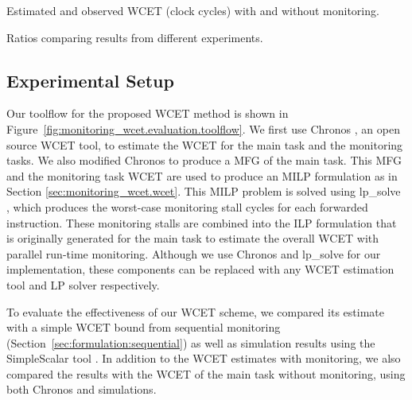 \begin{table}
  \begin{center}
    \begin{scriptsize}
    
    \end{scriptsize}
    \caption{Estimated and observed WCET (clock cycles) with and without monitoring.}
    \label{tab:monitoring_wcet.evaluation.wcet}
  \end{center}
\end{table}

\begin{table}
  \begin{center}
    \begin{tiny}
    
    \end{tiny}
    \caption{Ratios comparing results from different experiments.} 
    \label{tab:monitoring_wcet.evaluation.ratios}
  \end{center}
\end{table}

\subsection{Experimental Setup}

Our toolflow for the proposed WCET method is shown in
Figure~\ref{fig:monitoring_wcet.evaluation.toolflow}. We first use Chronos
\cite{chronos-tool}, an open source WCET tool, to estimate the WCET for the
main task and the monitoring tasks. We also modified Chronos to produce a MFG
of the main task. This MFG and the monitoring task WCET are used to produce an
MILP formulation as in Section \ref{sec:monitoring_wcet.wcet}. This MILP
problem is solved using lp\_solve \cite{lpsolve}, which produces the worst-case
monitoring stall cycles for each forwarded instruction. These monitoring stalls
are combined into the ILP formulation that is originally generated for the main
task to estimate the overall WCET with parallel run-time monitoring. Although
we use Chronos and lp\_solve for our implementation, these components can be
replaced with any WCET estimation tool and LP solver respectively.

To evaluate the effectiveness of our WCET scheme, we compared its estimate
with a simple WCET bound from sequential monitoring (Section~\ref{sec:formulation:sequential})
as well as simulation results using the SimpleScalar tool \cite{simplescalar}.
In addition to the WCET estimates with monitoring, we also compared the results with
the WCET of the main task without monitoring, using both Chronos and simulations. 

